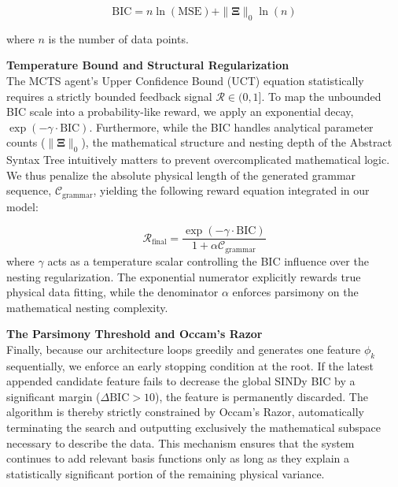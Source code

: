 \documentclass[11pt, a4paper]{article}
\begin{document}
\begin{equation}
    \text{BIC} = n \ln(\text{MSE}) + \|\mathbf{\Xi}\|_0 \ln(n)
\end{equation}

where $n$ is the number of data points.

\vspace{0.3cm}
\noindent \textbf{Temperature Bound and Structural Regularization}\\
The MCTS agent's Upper Confidence Bound (UCT) equation statistically requires a strictly bounded feedback signal $\mathcal{R} \in (0, 1]$. To map the unbounded BIC scale into a probability-like reward, we apply an exponential decay, $\exp(-\gamma \cdot \text{BIC})$. Furthermore, while the BIC handles analytical parameter counts ($\|\mathbf{\Xi}\|_0$), the mathematical structure and  nesting depth of the Abstract Syntax Tree intuitively matters to prevent overcomplicated mathematical logic.  We thus penalize the absolute physical length of the generated grammar sequence, $\mathcal{C}_{\text{grammar}}$, yielding the following reward equation integrated in our model:

\begin{equation}
    \boxed{
        \mathcal{R}_{\text{final}} = \frac{\exp(-\gamma \cdot \text{BIC})}{1 + \alpha \mathcal{C}_{\text{grammar}}}
    }
\end{equation}
where $\gamma$ acts as a temperature scalar controlling the BIC influence over the nesting regularization. The exponential numerator explicitly rewards true physical data fitting, while the denominator $\alpha$ enforces parsimony on the mathematical nesting complexity.


\vspace{0.3cm}
\noindent \textbf{The Parsimony Threshold and Occam's Razor}\\
Finally, because our architecture loops greedily and generates one feature $\phi_k$ sequentially, we enforce an early stopping condition at the root. If the latest appended candidate feature fails to decrease the global SINDy BIC by a significant margin ($\Delta \text{BIC} > 10$), the feature is permanently discarded. The algorithm is thereby strictly constrained by Occam's Razor, automatically terminating the search and outputting exclusively the mathematical subspace necessary to describe the data. This mechanism ensures that the system continues to add relevant basis functions only as long as they explain a statistically significant portion of the remaining physical variance.
\end{document}
